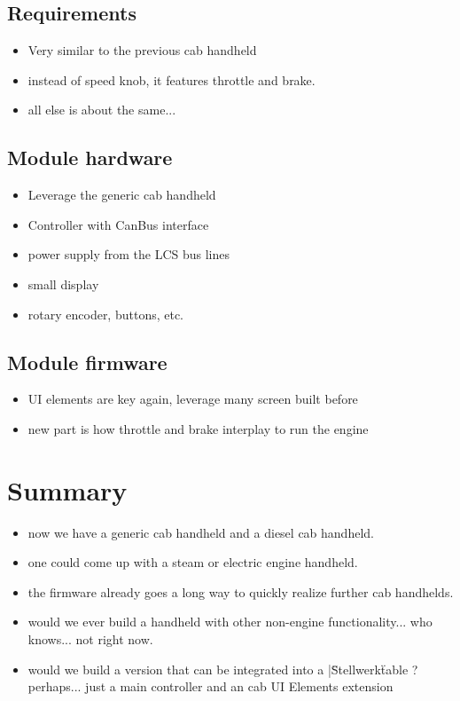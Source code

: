 \subsection{Requirements}

\begin{itemize}
\item Very similar to the previous cab handheld 
\item instead of speed knob, it features throttle and brake.
\item all else is about the same...
\end{itemize}

\subsection{Module hardware}

\begin{itemize}
\item Leverage the generic cab handheld
\item Controller with CanBus interface
\item power supply from the LCS bus lines
\item small display
\item rotary encoder, buttons, etc.
\end{itemize}

\subsection{Module firmware}

\begin{itemize}
\item UI elements are key again, leverage many screen built before
\item new part is how throttle and brake interplay to run the engine
\end{itemize}


\section{Summary}

\begin{itemize}
\item now we have a generic cab handheld and a diesel cab handheld.
\item one could come up with a steam or electric engine handheld. 
\item the firmware already goes a long way to quickly realize further cab handhelds.
\item would we ever build a handheld with other non-engine functionality... who knows... not right now.
\item would we build a version that can be integrated into a |\"Stellwerk\" table ? perhaps... just a main controller and an cab UI Elements extension
\end{itemize}

